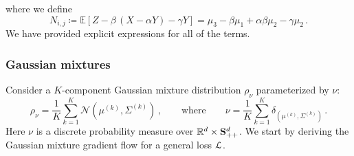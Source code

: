 \documentclass{custom}
\begin{document}
where we define
\[
N_{i,j}\coloneqq\mathbb{E}[Z-\beta\,(X-\alpha Y)-\gamma Y]=\mu_{3}-\beta\mu_{1}+\alpha\beta\mu_{2}-\gamma\mu_{2}\,.
\]
We have provided explicit expressions for all of the terms.


\subsubsection{Gaussian mixtures}\label{app:gmm}


Consider a $K$-component Gaussian mixture distribution $\rho_{\nu}$
parameterized by $\nu$:
\[
\rho_{\nu}=\frac{1}{K}\sum_{k=1}^{K}\mathcal{N}(\mu^{(k)},\Sigma^{(k)})\,,\qquad\text{where}\qquad\nu=\frac{1}{K}\sum_{k=1}^{K}\delta_{(\mu^{(k)},\Sigma^{(k)})}\,.
\]
Here $\nu$ is a discrete probability measure over $\mathbb{R}^{d}\times\mathbf{S}_{++}^{d}$.
We start by deriving the Gaussian mixture gradient flow for a general loss $\EuScript{L}$.
\end{document}
